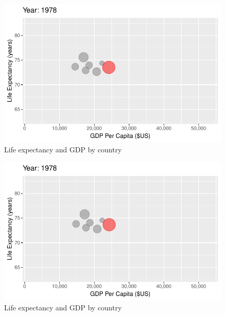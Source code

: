 \documentclass[
  letterpaper,
  DIV=11,
  numbers=noendperiod]{scrreport}
\theoremstyle{definition}
\theoremstyle{remark}
\begin{document}
\begin{figure}

{\centering \includegraphics{index_files/figure-pdf/fig-anim-country-47.pdf}

}

\caption{\label{fig-anim-country-47}Life expectancy and GDP by country}

\end{figure}

\begin{figure}

{\centering \includegraphics{index_files/figure-pdf/fig-anim-country-48.pdf}

}

\caption{\label{fig-anim-country-48}Life expectancy and GDP by country}

\end{figure}
\end{document}
